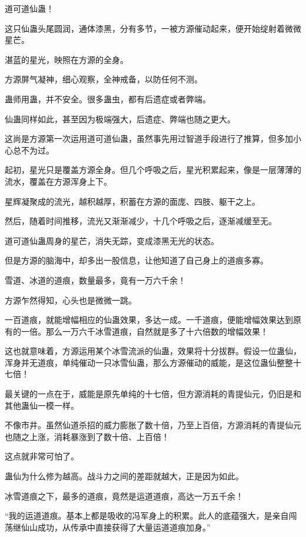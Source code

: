 
\begin{this_body}



道可道仙蛊！

这只仙蛊头尾圆润，通体漆黑，分有多节，一被方源催动起来，便开始绽射着微微星芒。

湛蓝的星光，映照在方源的全身。

方源屏气凝神，细心观察，全神戒备，以防任何不测。

蛊师用蛊，并不安全。很多蛊虫，都有后遗症或者弊端。

仙蛊同样如此，甚至因为极端强大，后遗症、弊端也随之更大。

这尚是方源第一次运用道可道仙蛊，虽然事先用过智道手段进行了推算，但多加小心总不为过。

起初，星光只是覆盖方源全身。但几个呼吸之后，星光积累起来，像是一层薄薄的流水，覆盖在方源浑身上下。

星辉凝聚成的流光，越积越厚，积蓄在方源的面庞、四肢、躯干之上。

然后，随着时间推移，流光又渐渐减少，十几个呼吸之后，逐渐减缓至无。

道可道仙蛊周身的星芒，消失无踪，变成漆黑无光的状态。

但是方源的脑海中，却多出一股信息，让他知道了自己身上的道痕多寡。

雪道、冰道的道痕，数量最多，竟有一万六千余！

方源乍然得知，心头也是微微一跳。

一百道痕，就能增幅相应的仙蛊效果，多达一成。一千道痕，便能增幅效果达到原有的一倍。那么一万六千冰雪道痕，自然就是多了十六倍数的增幅效果！

这也就意味着，方源运用某个冰雪流派的仙蛊，效果将十分拔群。假设一位蛊仙，浑身并无道痕，单纯催动一只冰雪仙蛊，那么方源催动的威能，是这位蛊仙整整十七倍！

最关键的一点在于，威能是原先单纯的十七倍，但方源消耗的青提仙元，仍旧是和其他蛊仙一模一样。

不像市井。虽然仙道杀招的威力膨胀了数十倍，乃至上百倍，方源消耗的青提仙元也随之上涨，消耗暴涨到了数十倍、上百倍！

这点就非常可怕了。

蛊仙为什么修为越高。战斗力之间的差距就越大，正是因为如此。

冰雪道痕之下，最多的道痕，竟然是运道道痕，高达一万五千余！

“我的运道道痕。基本上都是吸收的冯军身上的积累。此人的底蕴强大，是亲自闯荡继仙山成功，从传承中直接获得了大量运道道痕加身。”


\end{this_body}
